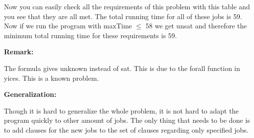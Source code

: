 \documentclass[12pt]{article}
\begin{document}
\vspace{3mm}

Now you can easily check all the requirements of this problem with this table and you see that they are all met. The total running time for all of these jobs is 59. Now if we run the program with maxTime $\leq$ 58 we get unsat and therefore the minimum total running time for these requirements is 59.

\vspace{3mm}

{\bf Remark:} 

The formula gives unknown instead of sat. This is due to the forall function in yices. This is a known problem.\\

\vspace{3mm}

{\bf Generalization:} 

Though it is hard to generalize the whole problem, it is not hard to adapt the program quickly to other amount of jobs. The only thing that needs to be done is to add clauses for the new jobs to the set of clauses regarding only specified jobs.\\

\vspace{3mm}
\end{document}
